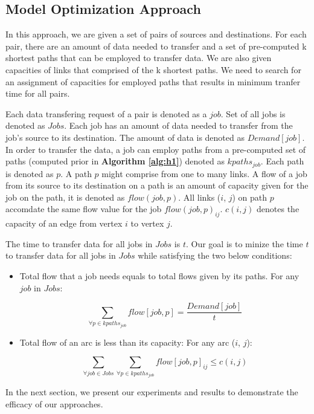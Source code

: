 \subsection{Model Optimization Approach}
\label{sec:optimization}

In this approach, we are given a set of pairs of sources and destinations. For each pair, there are an amount of data needed to transfer and a set of pre-computed k shortest paths that can be employed to transfer data. We are also given capacities of links that comprised of the k shortest paths. We need to search for an assignment of capacities for employed paths that results in minimum tranfer time for all pairs. 

Each data transfering request of a pair is denoted as a $job$. Set of all jobs is denoted as $Jobs$. Each job has an amount of data needed to transfer from the job's source to its destination. The amount of data is denoted as $Demand[job]$. In order to transfer the data, a job can employ paths from a pre-computed set of paths (computed prior in \textbf{Algorithm \ref{alg:h1}}) denoted as $kpaths_{job}$. Each path is denoted as $p$. A path $p$ might comprise from one to many links. A flow of a job from its source to its destination on a path is an amount of capacity given for the job on the path, it is denoted as $flow(job, p)$. All links ($i$, $j$) on path $p$ accomdate the same flow value for the job $flow(job, p)_{ij}$. $c(i,j)$ denotes the capacity of an edge from vertex $i$ to vertex $j$.

The time to transfer data for all jobs in $Jobs$ is $t$. Our goal is to minize the time $t$ to transfer data for all jobs in $Jobs$ while satisfying the two below conditions:

\begin{itemize}
\item Total flow that a job needs equals to total flows given by its paths. For any $job$ in $Jobs$: 

$$\sum_{\forall p \in kpaths_{job}} flow[job, p] = \frac{Demand[job]}{t}$$

\item Total flow of an arc is less than its capacity: For any arc ($i$, $j$):

$$\sum_{\forall job \in Jobs}\sum_{\forall p \in kpaths_{job}} flow[job, p]_{ij} \leq c(i, j) $$

\end{itemize}

%

In the next section, we present our experiments and results to demonstrate the efficacy of our approaches.
